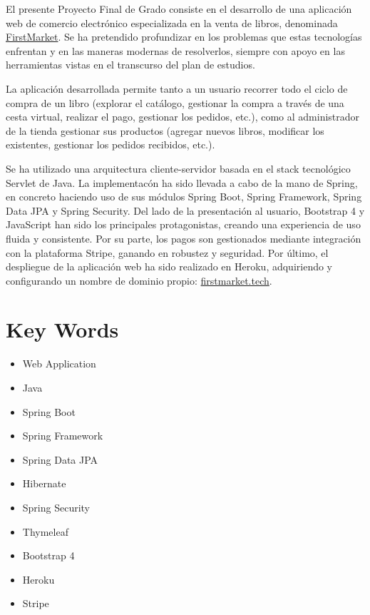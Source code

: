 \documentclass[a4paper,12pt,twoside,openright]{report}
\begin{document}
   El presente Proyecto Final de Grado consiste en el desarrollo de una aplicación web de comercio electrónico especializada en la venta de libros, denominada \href{https://firstmarket.tech}{FirstMarket}. Se ha pretendido profundizar en los problemas que estas tecnologías enfrentan y en las maneras modernas de resolverlos, siempre con apoyo en las herramientas vistas en el transcurso del plan de estudios.
   
   La aplicación desarrollada permite tanto a un usuario recorrer todo el ciclo de compra de un libro (explorar el catálogo, gestionar la compra a través de una cesta virtual, realizar el pago, gestionar los pedidos, etc.), como al administrador de la tienda gestionar sus productos (agregar nuevos libros, modificar los existentes, gestionar los pedidos recibidos, etc.).
   
   Se ha utilizado una arquitectura cliente-servidor basada en el stack tecnológico Servlet de Java. La implementacón ha sido llevada a cabo de la mano de Spring, en concreto haciendo uso de sus módulos Spring Boot, Spring Framework, Spring Data JPA y Spring Security. Del lado de la presentación al usuario, Bootstrap 4 y JavaScript han sido los principales protagonistas, creando una experiencia de uso fluida y consistente. Por su parte, los pagos son gestionados mediante integración con la plataforma Stripe, ganando en robustez y seguridad. Por último, el despliegue de la aplicación web ha sido realizado en Heroku, adquiriendo y configurando un nombre de dominio propio: \href{https://firstmarket.tech}{firstmarket.tech}.
   \pagebreak
   
   \section*{Key Words}
   \thispagestyle{empty}
   \begin{itemize}
	   	\item Web Application
	   	\item Java
	   	\item Spring Boot
	   	\item Spring Framework
	   	\item Spring Data JPA
	   	\item Hibernate
	   	\item Spring Security
	   	\item Thymeleaf
	   	\item Bootstrap 4
	   	\item Heroku
	   	\item Stripe
   \end{itemize}
   \clearpage
   
\end{document}
